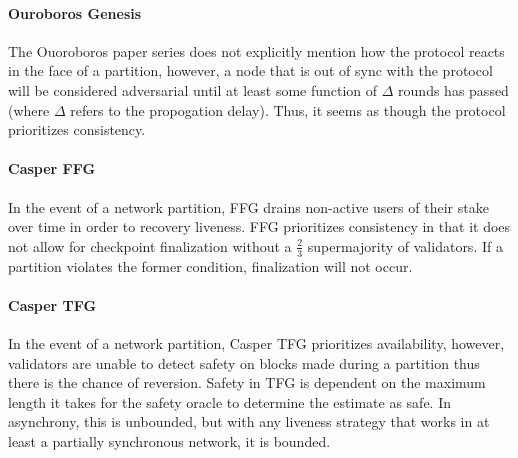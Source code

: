 \documentclass[10pt,journal,compsoc]{IEEEtran}
\begin{document}
\paragraph{Ouroboros Genesis} The Ouoroboros paper series does not explicitly mention how the protocol reacts in the face of a partition, however, a node that is out of sync with the protocol will be considered adversarial until at least some function of $\Delta$ rounds has passed (where $\Delta$ refers to the propogation delay). Thus, it seems as though the protocol prioritizes consistency. 

\paragraph{Casper FFG} In the event of a network partition, FFG drains non-active users of their stake over time in order to recovery liveness. FFG prioritizes consistency in that it does not allow for checkpoint finalization without a \(\frac{2}{3}\) supermajority of validators. If a partition violates the former condition, finalization will not occur. 

\paragraph{Casper TFG} In the event of a network partition, Casper TFG prioritizes availability, however, validators are unable to detect safety on blocks made during a partition thus there is the chance of reversion. Safety in TFG is dependent on the maximum length it takes for the safety oracle to determine the estimate as safe. In asynchrony, this is unbounded, but with any liveness strategy that works in at least a partially synchronous network, it is bounded.			
%
%
\end{document}
